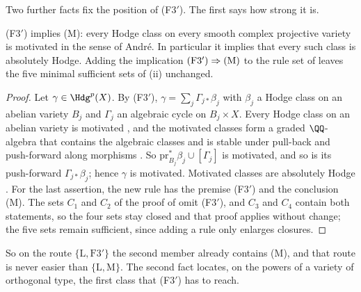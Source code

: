 Two further facts fix the position of \textup{(F3$'$)}. The first says how
strong it is.

\begin{proposition}\label{prop:f3primestrength}
\textup{(F3$'$)} implies \textup{(M)}: every Hodge class on every smooth
complex projective variety is motivated in the sense of Andr\'e. In
particular it implies that every such class is absolutely Hodge. Adding the
implication $\textup{(F3$'$)}\Rightarrow\textup{(M)}$ to the rule set of
 leaves the five minimal sufficient sets of
(ii) unchanged.
\end{proposition}

\begin{proof}
Let $\gamma\in\Hdg^{p}(X)$. By \textup{(F3$'$)},
$\gamma=\sum_{j}\Gamma_{j*}\beta_{j}$ with $\beta_{j}$ a Hodge class on an
abelian variety $B_{j}$ and $\Gamma_{j}$ an algebraic cycle on $B_{j}\times X$.
Every Hodge class on an abelian variety is motivated
\cite[Th\'eor\`eme~0.6.2]{And96b}, and the motivated classes form a graded
$\QQ$-algebra that contains the algebraic classes and is stable under
pull-back and push-forward along morphisms \cite[\S2]{And96b}. So
$\mathrm{pr}_{B_{j}}^{*}\beta_{j}\cup[\Gamma_{j}]$ is motivated, and so is its
push-forward $\Gamma_{j*}\beta_{j}$; hence $\gamma$ is motivated. Motivated
classes are absolutely Hodge \cite[\S2]{And96b}. For the last assertion,
the new rule has the premise (F3$'$) and the conclusion (M). The sets $C_{1}$
and $C_{2}$ of the proof of  omit (F3$'$), and $C_{3}$ and
$C_{4}$ contain both statements, so the four sets stay closed and that proof
applies without change; the five sets remain sufficient, since adding a rule
only enlarges closures.
\end{proof}

So on the route $\{\mathrm{L},\mathrm{F3}'\}$ the second member already
contains \textup{(M)}, and that route is never easier than
$\{\mathrm{L},\mathrm{M}\}$. The second fact locates, on the powers of a variety of orthogonal type,
the first class that \textup{(F3$'$)} has to reach.

